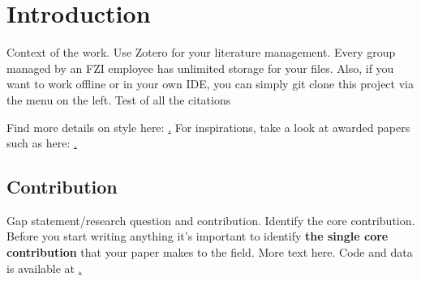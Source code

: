 \section{Introduction}
\label{sec:introduction}

Context of the work. Use Zotero for your literature management. Every group managed by an FZI employee has unlimited storage for your files. Also, if you want to work offline or in your own IDE, you can simply git clone this project via the menu on the left. Test of all the citations
\cite{Bogdoll_Compressing_2021_NeurIPS}
\cite{Bogdoll_Description_2021_ICCV}
\cite{Bogdoll_KIGLIS_2021_ISC2}
\cite{Bogdoll_Taxonomy_2021_arXiv}
\cite{Toettel_Reliving_2021_arXiv}
\cite{Reichert_Towards_2021_ISC2}
\cite{Koduri_Aureate_2018_WCX}

Find more details on style here: \href{https://github.com/daniel-bogdoll/ConferenceTemplate/blob/main/README.md}. For inspirations, take a look at awarded papers such as here: \href{https://cvpr2021.thecvf.com/node/329}.

\subsection{Contribution}
Gap statement/research question and contribution. Identify the core contribution. Before you start writing anything it’s important to identify \textbf{the single core contribution} that your paper makes to the field. More text here. Code and data is
available at \href{https://github.com/xxxxx}.


